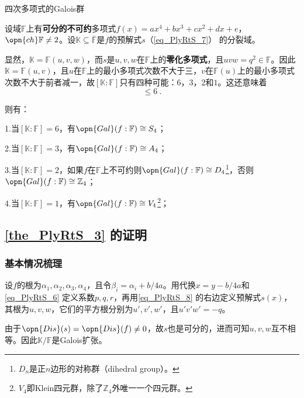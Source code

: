 \begin{theorem}{四次多项式的Galois群}\label{the_PlyRtS_3}

设域$\mathbb{F}$上有\textbf{可分的不可约}多项式$f(x)=ax^4+bx^3+cx^2+dx+e$，$\opn{ch}\mathbb{F}\neq 2$。设$\mathbb{K}\subseteq\overline{\mathbb{F}}$是$f$的预解式$s$（\autoref{eq_PlyRtS_7}） 的分裂域。

显然，$\mathbb{K}=\mathbb{F}(u, v, w)$，而$s$是$u, v, w$在$\mathbb{F}$上的\textbf{零化多项式}，且$uvw=q^2\in\mathbb{F}$。因此$\mathbb{K}=\mathbb{F}(u, v)$，且$u$在$\mathbb{F}$上的最小多项式次数不大于三，$v$在$\mathbb{F}(u)$上的最小多项式次数不大于前者减一，故$[\mathbb{K}:\mathbb{F}]$只有四种可能：$6$，$3$，$2$和$1$。这还意味着
\begin{equation}
[\mathbb{K}:\mathbb{F}]\leq 6~.
\end{equation}

则有：

1.当$[\mathbb{K}:\mathbb{F}]=6$，有$\opn{Gal}(f:\mathbb{F})\cong S_4$；

2.当$[\mathbb{K}:\mathbb{F}]=3$，有$\opn{Gal}(f:\mathbb{F})\cong A_4$；

3.当$[\mathbb{K}:\mathbb{F}]=2$，如果$f$在$\mathbb{F}$上不可约则$\opn{Gal}(f:\mathbb{F})\cong D_4$\footnote{$D_n$是正$n$边形的对称群（dihedral group）。}，否则$\opn{Gal}(f:\mathbb{F})\cong \mathbb{Z}_4$；

4.当$[\mathbb{K}:\mathbb{F}]=1$，有$\opn{Gal}(f:\mathbb{F})\cong V_4$\footnote{$V_4$即Klein四元群，除了$\mathbb{Z}_4$外唯一一个四元群。}；

\end{theorem}

\subsection{\autoref{the_PlyRtS_3} 的证明}

\subsubsection{基本情况梳理}


设$f$的根为$\alpha_1, \alpha_2, \alpha_3, \alpha_4$，且令$\beta_i=\alpha_i+b/4a$。用代换$x=y-b/4a$和\autoref{eq_PlyRtS_6} 定义系数$p, q, r$，再用\autoref{eq_PlyRtS_8}  的右边定义预解式$s(x)$，其根为$u, v, w$，它们的平方根分别为$u', v', w'$，且$u'v'w'=-q$。

由于$\opn{Dis}(s)=\opn{Dis}(f)\neq 0$，故$s$也是可分的，进而可知$u, v, w$互不相等。因此$\mathbb{K}/\mathbb{F}$是Galois扩张。

